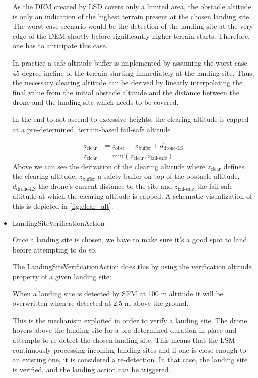 \begin{itemize}
    As the DEM created by LSD covers only a limited area, the obstacle altitude is only an indication of the highest terrain present at the chosen landing site. The worst case scenario would be the detection of the landing site at the very edge of the DEM shortly before significantly higher terrain starts. Therefore, one has to anticipate this case. 

    In practice a safe altitude buffer is implemented by assuming the worst case 45-degree incline of the terrain starting immediately at the landing site. Thus, the necessary clearing altitude can be derived by linearly interpolating the final value from the initial obstacle altitude and the distance between the drone and the landing site which needs to be covered.

    In the end to not ascend to excessive heights, the clearing altitude is capped at a pre-determined, terrain-based fail-safe altitude

    \begin{align}
        z_{\text{clear}} &= z_{\text{obst.}} + z_{\text{buffer}} + d_{\text{drone-LS}}\\
        z_{\text{clear}} &= \text{min}\left(z_{\text{clear}}, z_{\text{fail-safe}}\right)
    \end{align}
    Above we can see the derivation of the clearing altitude where $z_{\text{clear}}$ defines the clearing altitude, $z_{\text{buffer}}$ a safety buffer on top of the obstacle altitude, $d_{\text{drone-LS}}$ the drone's current distance to the site and $z_{\text{fail-safe}}$ the fail-safe altitude at which the clearing altitude is capped. A schematic visualization of this is depicted in \cref{fig:clear_alt}.
    \item LandingSiteVerificationAction
    
    Once a landing site is chosen, we have to make sure it's a good spot to land before attempting to do so. 

    The LandingSiteVerificationAction does this by using the verification altitude property of a given landing site:

    When a landing site is detected by SFM at 100 m altitude it will be overwritten when re-detected at 2.5 m above the ground. 

    This is the mechanism exploited in order to verify a landing site. The drone hovers above the landing site for a pre-determined duration in place and attempts to re-detect the chosen landing site. This means that the LSM continuously processing incoming landing sites and if one is close enough to an existing one, it is considered a re-detection. In that case, the landing site is verified, and the landing action can be triggered.


\end{itemize}
